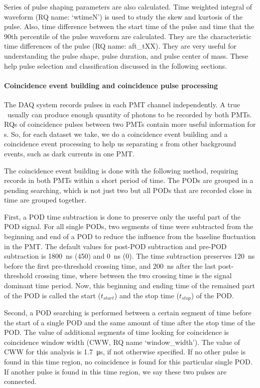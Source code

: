Series of pulse shaping parameters are also calculated. Time weighted integral of waveform (RQ name: `wtimeN') is used to study the skew and kurtosis of the pulse. Also, time difference between the start time of the pulse and time that the 90th percentile of the pulse waveform are calculated. They are the characteristic time differences of the pulse (RQ name: aft\_tXX). They are very useful for understanding the pulse shape, pulse duration, and pulse center of mass. These help pulse selection and classification discussed in the following sections. 

\paragraph{Coincidence event building and coincidence pulse processing}  \label{par:coinbuild}
The DAQ system records pulses in each PMT channel independently. A true \ees\ usually can produce enough quantity of photons to be recorded by both PMTs. RQs of coincidence pulses between two PMTs contain more useful information for \ees s. So, for each dataset we take, we do a coincidence event building and a coincidence event processing to help us separating \ees s from other background events, such as dark currents in one PMT. 

The coincidence event building is done with the following method, requiring records in both PMTs within a short period of time. The PODs are grouped in a pending searching, which is not just two but all PODs that are recorded close in time are grouped together. 

First, a POD time subtraction is done to preserve only the useful part of the POD signal. For all single PODs, two segments of time were subtracted from the beginning and end of a POD to reduce the influence from the baseline fluctuation in the PMT. The default values for post-POD subtraction and pre-POD subtraction is \SI{1800}{\ns} (\SI{450}{\sample}) and \SI{0}{\ns} (\SI{0}{\sample}). The time subtraction preserves \SI{120}{\ns} before the first pre-threshold crossing time, and \SI{200}{\ns} after the last post-threshold crossing time, where between the two crossing time is the signal dominant time period. Now, this beginning and ending time of the remained part of the POD is called the start ($t_{start}$) and the stop time ($t_{stop}$) of the POD. 

Second, a POD searching is performed between a certain segment of time before the start of a single POD and the same amount of time after the stop time of the POD. The value of additional segments of time looking for coincidence is coincidence window width (CWW, RQ name `window\_width'). The value of CWW for this analysis is \SI{1.7}{\us}, if not otherwise specified. If no other pulse is found in this time region, no coincidence is found for this particular single POD. If another pulse is found in this time region, we say these two pulses are connected. 

